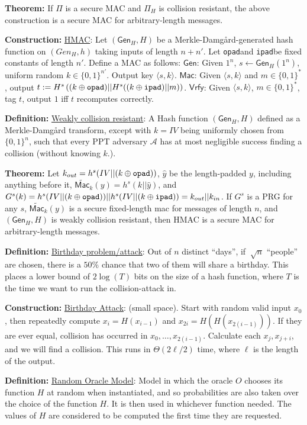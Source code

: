 \documentclass[10pt]{article}
\newcommand{\AAA}{\mathcal{A}}
\newcommand{\defn}[1]{{\bf Definition:} \underline{#1}}
\newcommand{\thm}[1]{{\bf Theorem:} \underline{#1}}
\newcommand{\con}[1]{{\bf Construction:} \underline{#1}}
\newcommand{\Mac}{\mathsf{Mac}}
\newcommand{\Vrfy}{\mathsf{Vrfy}}
\newcommand{\Gen}{\mathsf{Gen}}
\newcommand{\ang}[1]{\langle#1\rangle}
\newcommand{\xor}{\oplus}
\newcommand{\opad}{{\tt opad}}
\newcommand{\ipad}{{\tt ipad}}
\newcommand{\from}{\leftarrow}
\begin{document}
\begin{multicols}{4}
\thm{}If $\Pi$ is a secure MAC and $\Pi_H$ is collision resistant, the above construction is a secure MAC for arbitrary-length messages.

\con{HMAC}: Let $(\Gen_H,H)$ be a Merkle-Damg\r{a}rd-generated hash function on $(Gen_H,h)$ taking inputs of length $n+n'$. Let \opad and \ipad be fixed constants of length $n'$. Define a MAC as follows: $\Gen$: Given $1^n$, $s\from\Gen_H(1^n)$, uniform random $k\in\{0,1\}^{n'}$. Output key $\ang{s,k}$. $\Mac$: Given $\ang{s,k}$ and $m\in\{0,1\}^*$, output $t:=H^s\left((k\xor\opad)||H^s((k\xor\ipad)||m)\right)$. $\Vrfy$: Given $\ang{s,k}$, $m\in\{0,1\}^*$, tag $t$, output $1$ iff $t$ recomputes correctly.

\defn{Weakly collision resistant}: A Hash function $(\Gen_H, H)$ defined as a Merkle-Damg\r{a}rd transform, except with $k=IV$ being uniformly chosen from $\{0,1\}^n$, such that every PPT adversary $\AAA$ has at most negligible success finding a collision (without knowing $k$.).

\thm{}Let $k_{out}=h^s(IV||(k\xor\opad))$, $\hat{y}$ be the length-padded $y$, including anything before it, $\widetilde{\Mac}_k(y)=h^s(k||\hat{y})$, and $G^s(k)=h^s(IV||(k\xor\opad))||h^s(IV||(k\xor\ipad))=k_{out}||k_{in}$. If $G^s$ is a PRG for any $s$, $\widetilde{\Mac}_k(y)$ is a secure fixed-length mac for messages of length $n$, and $(\Gen_H,H)$ is weakly collision resistant, then HMAC is a secure MAC for arbitrary-length messages.

\defn{Birthday problem/attack}: Out of $n$ distinct ``days'', if $~\sqrt{n}$ ``people'' are chosen, there is a $50\%$ chance that two of them will share a birthday. This places a lower bound of $2\log(T)$ bits on the size of a hash function, where $T$ is the time we want to run the collision-attack in.

\con{Birthday Attack}: (small space). Start with random valid input $x_0$, then repeatedly compute $x_i=H(x_{i-1})$ and $x_{2i}=H(H(x_{2(i-1)}))$. If they are ever equal, collision has occurred in $x_0,\dots,x_{2(i-1)}$. Calculate each $x_j,x_{j+i}$, and we will find a collision. This runs in $\Theta(2{\ell/2})$ time, where $\ell$ is the length of the output.

\defn{Random Oracle Model}: Model in which the oracle $O$ chooses its function $H$ at random when instantiated, and so probabilities are also taken over the choice of the function $H$. It is then used in whichever function needed. The values of $H$ are considered to be computed the first time they are requested.


\end{multicols}
\end{document}
